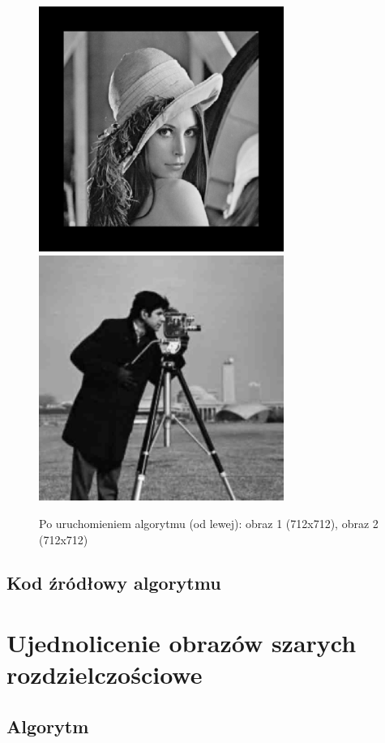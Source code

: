 \documentclass[a4paper,12pt]{book}
\begin{document}
\begin{figure}[H]
	\caption{Po uruchomieniem algorytmu (od lewej): obraz 1 (712x712), obraz 2 (712x712)}
	\includegraphics[width=8cm, height=8cm]{1-1/geometric-gray-lena-photoman.png}
	\includegraphics[width=8cm, height=8cm]{1-1/geometric-gray-photoman-lena.png}
\end{figure}

\subsection*{Kod źródłowy algorytmu}

\section{Ujednolicenie obrazów szarych rozdzielczościowe}
\subsection*{Algorytm}
\end{document}

